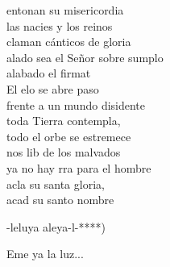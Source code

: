 \begin{cancion}
entonan su misericordia\\
	las nacies y los reinos \\
claman cánticos de gloria\\
	alado sea el Señor sobre sumplo\\
	alabado el firmat\\
	El elo se abre paso \\
frente a un mundo disidente\\
	toda  Tierra contempla, \\
todo el orbe se estremece\\
	nos lib de los malvados  \\
	ya no hay rra para el hombre\\
	acla su santa gloria,\\
	 acad su santo nombre\\
	\begin{chorus}%
	-leluya aleya-l-*)\\
	\end{chorus}%
	Eme ya la luz...\\
\end{cancion}%
